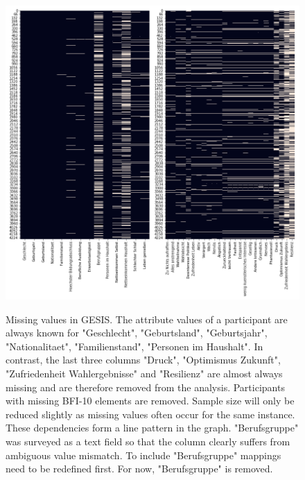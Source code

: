 \begin{figure}[h]
	\begin{center}
		\includegraphics[scale=0.50,angle=0]{fig/gesis_missing}
		\label{gesis_miss}
		\caption{Missing values in GESIS. The attribute values of a participant are always known for "Geschlecht", "Geburtsland", "Geburtsjahr", "Nationalitaet", "Familienstand", "Personen im Haushalt". In contrast, the last three columns "Druck", "Optimismus Zukunft", "Zufriedenheit Wahlergebnisse" and "Resilienz" are almost always missing and are therefore removed from the analysis. Participants with missing BFI-10 elements are removed. Sample size will only be reduced slightly as missing values often occur for the same instance. These dependencies form a line pattern in the graph. "Berufsgruppe" was surveyed as a text field so that the column clearly suffers from ambiguous value mismatch. To include "Berufsgruppe" mappings need to be redefined first. For now, "Berufsgruppe" is removed. }
	\end{center}
\end{figure}

